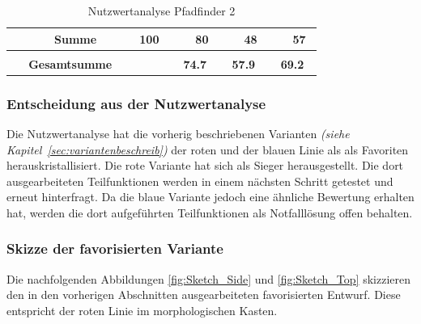 \documentclass[main.tex]{subfiles} %
\begin{document}
\begin{landscape}
\begin{table}[H]
\begin{tabular}{|p{0.11\linewidth}|p{0.18\linewidth}|p{0.085\linewidth}|p{0.057\linewidth}|p{0.07\linewidth}|p{0.057\linewidth}|p{0.07\linewidth}|p{0.057\linewidth}|p{0.07\linewidth}|}
                                                           & \textbf{Summe}                      & \textbf{100}                               &                                             & \textbf{80}                                 &   & \textbf{48}   &   & \textbf{57} \\[1pt]
            \hline
            \hline
            \multicolumn{2}{|c|}{}                         &                                     & \multicolumn{2}{c|}{}                      & \multicolumn{2}{c|}{}                       & \multicolumn{2}{c|}{}                                                             \\[-9pt]
            \multicolumn{2}{|c|}{\textbf{Gesamtsumme}}     &                                     & \multicolumn{2}{c|}{\textbf{74.7}}         & \multicolumn{2}{c|}{\textbf{57.9}}          & \multicolumn{2}{c|}{\textbf{69.2}}                                                \\[1pt]
            \hline
        \end{tabular}
        \caption{Nutzwertanalyse Pfadfinder 2}
    \end{table}

\end{landscape} %

\subsubsection{Entscheidung aus der Nutzwertanalyse}
Die Nutzwertanalyse hat die vorherig beschriebenen Varianten \textit{(siehe
    Kapitel~\ref{sec:variantenbeschreib})} der roten und der blauen Linie als als
Favoriten herauskristallisiert. Die rote Variante hat sich als Sieger
herausgestellt. Die dort ausgearbeiteten Teilfunktionen werden in einem
nächsten Schritt getestet und erneut hinterfragt. Da die blaue Variante jedoch
eine ähnliche Bewertung erhalten hat, werden die dort aufgeführten
Teilfunktionen als Notfalllösung offen behalten.


\subsubsection{Skizze der favorisierten Variante}

Die nachfolgenden Abbildungen \ref{fig:Sketch_Side} und \ref{fig:Sketch_Top}
skizzieren den in den vorherigen Abschnitten ausgearbeiteten favorisierten
Entwurf. Diese entspricht der roten Linie im morphologischen Kasten.
\end{document}
